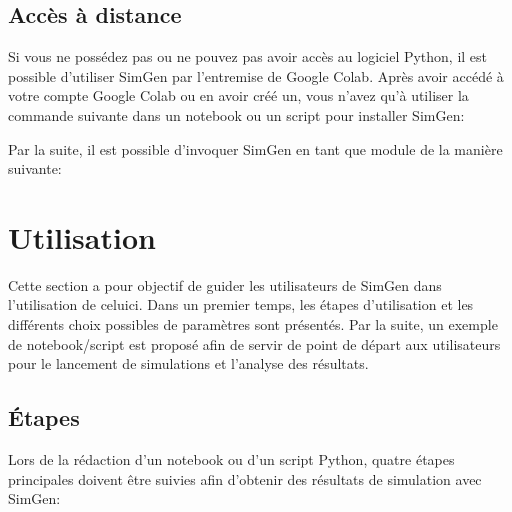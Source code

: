 \documentclass[letterpaper,10pt,french]{sphinxmanual}
\begin{document}
\begin{sphinxVerbatim}[commandchars=\\\{\}]
 

 
\end{sphinxVerbatim}


\subsection{Accès à distance}
\label{\detokenize{installation:acces-a-distance}}
Si vous ne possédez pas ou ne pouvez pas avoir accès au logiciel Python,
il est possible d’utiliser SimGen par l’entremise de Google Colab.
Après avoir accédé à votre compte Google Colab ou en avoir créé un, vous n’avez
qu’à utiliser la commande suivante dans un notebook ou un script pour installer SimGen:

\begin{sphinxVerbatim}[commandchars=\\\{\}]
  
\end{sphinxVerbatim}

Par la suite, il est possible d’invoquer SimGen en tant que module de la manière suivante:

\begin{sphinxVerbatim}[commandchars=\\\{\}]
 
\end{sphinxVerbatim}


\section{Utilisation}
\label{\detokenize{utilisation:utilisation}}\label{\detokenize{utilisation:id1}}\label{\detokenize{utilisation::doc}}
Cette section a pour objectif de guider les utilisateurs de SimGen dans l’utilisation de celui\sphinxhyphen{}ci.
Dans un premier temps, les étapes d’utilisation et les différents choix possibles de paramètres sont présentés.
Par la suite, un exemple de notebook/script est proposé afin de servir de point de départ
aux utilisateurs pour le lancement de simulations et l’analyse des résultats.


\subsection{Étapes}
\label{\detokenize{utilisation:id2}}
Lors de la rédaction d’un notebook ou d’un script Python, quatre étapes principales doivent être suivies afin d’obtenir des résultats de simulation avec SimGen:
\end{document}
